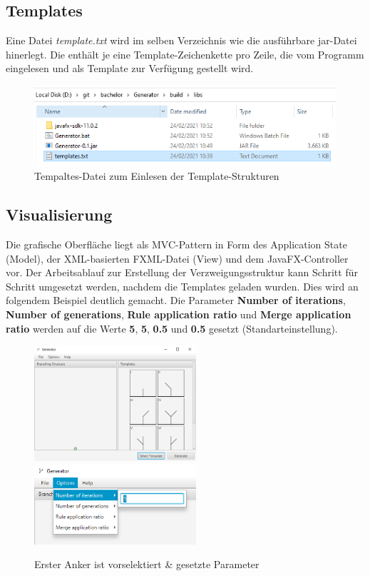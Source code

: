 \subsection*{Templates}
Eine Datei \textit{template.txt} wird im selben Verzeichnis wie die ausführbare jar-Datei hinerlegt.
Die enthält je eine Template-Zeichenkette pro Zeile, die vom Programm eingelesen und als Template
zur Verfügung gestellt wird.
\begin{figure}[H]
    \centering
    \includegraphics[width=12cm]{../images/templates_file.png}
    \caption{Tempaltes-Datei zum Einlesen der Template-Strukturen}
\end{figure}

\newpage

\subsection*{Visualisierung}
Die grafische Oberfläche liegt als MVC-Pattern in Form des Application State (Model), der XML-basierten FXML-Datei (View)
und dem JavaFX-Controller vor.
Der Arbeitsablauf zur Erstellung der Verzweigungsstruktur kann Schritt für Schritt umgesetzt werden, nachdem die Templates
geladen wurden.
Dies wird an folgendem Beispiel deutlich gemacht.
Die Parameter \textbf{Number of iterations}, \textbf{Number of generations}, \textbf{Rule application ratio} und
\textbf{Merge application ratio} werden auf die Werte \textbf{5}, \textbf{5}, \textbf{0.5} und \textbf{0.5} gesetzt
(Standarteinstellung).
\begin{figure}[H]
    \centering
    \includegraphics[width=6cm]{../images/UI_templates.png}
    \includegraphics[width=6cm]{../images/UI_parameters.png}
    \caption{Erster Anker ist vorselektiert \& gesetzte Parameter}
\end{figure}

